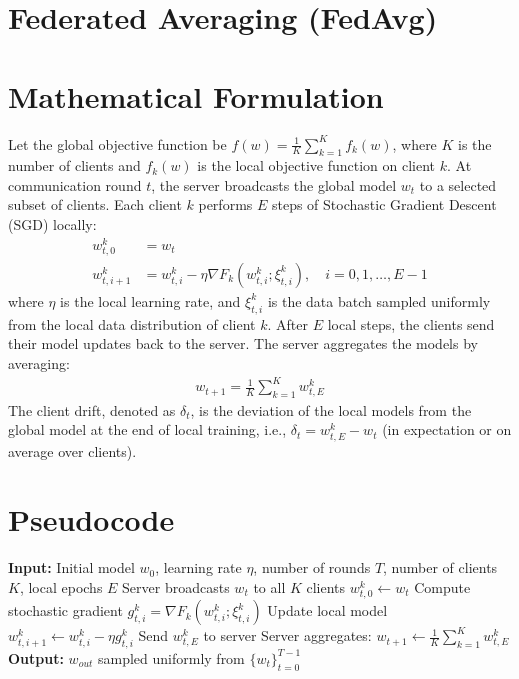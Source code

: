 \documentclass{article}
\begin{document}
\section*{Federated Averaging (FedAvg)}
\section*{Mathematical Formulation}
Let the global objective function be $f(w) = \frac{1}{K} \sum_{k=1}^K f_k(w)$, where $K$ is the number of clients and $f_k(w)$ is the local objective function on client $k$. At communication round $t$, the server broadcasts the global model $w_t$ to a selected subset of clients. Each client $k$ performs $E$ steps of Stochastic Gradient Descent (SGD) locally:
\begin{align}
w_{t,0}^k &= w_t \\
w_{t,i+1}^k &= w_{t,i}^k - \eta \nabla F_k(w_{t,i}^k; \xi_{t,i}^k), \quad i = 0, 1, \dots, E-1
\end{align}
where $\eta$ is the local learning rate, and $\xi_{t,i}^k$ is the data batch sampled uniformly from the local data distribution of client $k$. After $E$ local steps, the clients send their model updates back to the server. The server aggregates the models by averaging:
\begin{align}
w_{t+1} = \frac{1}{K} \sum_{k=1}^K w_{t,E}^k
\end{align}
The client drift, denoted as $\delta_t$, is the deviation of the local models from the global model at the end of local training, i.e., $\delta_t = w_{t,E}^k - w_t$ (in expectation or on average over clients).

\section*{Pseudocode}
\begin{algorithm}[H]
\caption{Federated Averaging (FedAvg)}
\begin{algorithmic}[1]
\State \textbf{Input:} Initial model $w_0$, learning rate $\eta$, number of rounds $T$, number of clients $K$, local epochs $E$
\State Server broadcasts $w_t$ to all $K$ clients
\State $w_{t,0}^k \gets w_t$
\State Compute stochastic gradient $g_{t,i}^k = \nabla F_k(w_{t,i}^k; \xi_{t,i}^k)$
\State Update local model $w_{t,i+1}^k \gets w_{t,i}^k - \eta g_{t,i}^k$
\EndFor
\State Send $w_{t,E}^k$ to server
\EndFor
\State Server aggregates: $w_{t+1} \gets \frac{1}{K} \sum_{k=1}^K w_{t,E}^k$
\EndFor
\State \textbf{Output:} $w_{out}$ sampled uniformly from $\{w_t\}_{t=0}^{T-1}$
\end{algorithmic}
\end{algorithm}
\end{document}
